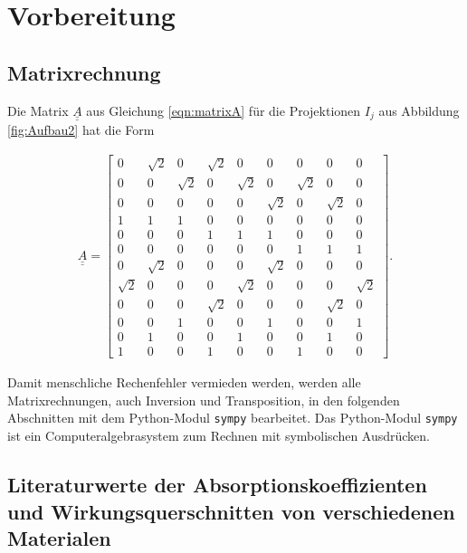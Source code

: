\section{Vorbereitung}
\label{sec:Vorbereitung}

\subsection{Matrixrechnung}

Die Matrix $\underline{\underline{A}}$ aus Gleichung \ref{eqn:matrixA} für die Projektionen $I_j$ aus Abbildung \ref{fig:Aufbau2} hat die Form 

\begin{align}
  \underline{\underline{A}} = \left[\begin{matrix}0 & \sqrt{2} & 0 & \sqrt{2} & 0 & 0 & 0 & 0 & 0\\0 & 0 & \sqrt{2} & 0 & \sqrt{2} & 0 & \sqrt{2} & 0 & 0\\0 & 0 & 0 & 0 & 0 & \sqrt{2} & 0 & \sqrt{2} & 0\\1 & 1 & 1 & 0 & 0 & 0 & 0 & 0 & 0\\0 & 0 & 0 & 1 & 1 & 1 & 0 & 0 & 0\\0 & 0 & 0 & 0 & 0 & 0 & 1 & 1 & 1\\0 & \sqrt{2} & 0 & 0 & 0 & \sqrt{2} & 0 & 0 & 0\\\sqrt{2} & 0 & 0 & 0 & \sqrt{2} & 0 & 0 & 0 & \sqrt{2}\\0 & 0 & 0 & \sqrt{2} & 0 & 0 & 0 & \sqrt{2} & 0\\0 & 0 & 1 & 0 & 0 & 1 & 0 & 0 & 1\\0 & 1 & 0 & 0 & 1 & 0 & 0 & 1 & 0\\1 & 0 & 0 & 1 & 0 & 0 & 1 & 0 & 0\end{matrix}\right].
\end{align}

Damit menschliche Rechenfehler vermieden werden, werden alle Matrixrechnungen, auch Inversion und Transposition, in den folgenden Abschnitten mit dem Python-Modul \texttt{sympy} \cite{sympy} bearbeitet. Das Python-Modul \texttt{sympy} ist ein Computeralgebrasystem zum Rechnen mit symbolischen Ausdrücken. 

\subsection{Literaturwerte der Absorptionskoeffizienten und Wirkungsquerschnitten von verschiedenen Materialen }

